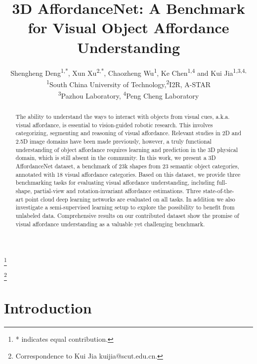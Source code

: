 \documentclass[final]{cvpr}
\begin{document}
\title{3D AffordanceNet: A Benchmark for Visual Object Affordance Understanding}





\author{Shengheng Deng\textsuperscript{1,*},
Xun Xu\textsuperscript{2,*}, Chaozheng Wu\textsuperscript{1},
Ke Chen\textsuperscript{1,4} and Kui Jia\textsuperscript{1,3,4,\textdagger}\\
\textsuperscript{1}South China University of Technology,\quad \textsuperscript{2}I2R, A-STAR\\ \textsuperscript{3}Pazhou Laboratory, \quad \textsuperscript{4}Peng Cheng Laboratory\\
}

\maketitle
\let\thefootnote\relax\footnote{* indicates equal contribution.}

\let\thefootnote\relax\footnote{\textsuperscript{\textdagger}Correspondence to Kui Jia kuijia@scut.edu.cn.}

\begin{abstract}
The ability to understand the ways to interact with objects from visual cues, a.k.a. visual affordance, is essential to vision-guided robotic research. This involves categorizing, segmenting and reasoning of visual affordance. Relevant studies in 2D and 2.5D image domains have been made previously, however, a truly functional understanding of object affordance requires learning and prediction in the 3D physical domain, which is still absent in the community. In this work, we present a 3D AffordanceNet dataset, a benchmark of 23k shapes from 23 semantic object categories, annotated with 18 visual affordance categories. Based on this dataset, we provide three benchmarking tasks for evaluating visual affordance understanding, including full-shape, partial-view and rotation-invariant affordance estimations. Three state-of-the-art point cloud deep learning networks are evaluated on all tasks. In addition we also investigate a semi-supervised learning setup to explore the possibility to benefit from unlabeled data. Comprehensive results on our contributed dataset show the promise of visual affordance understanding as a valuable yet challenging benchmark.  
\end{abstract}

\section{Introduction}
\end{document}
